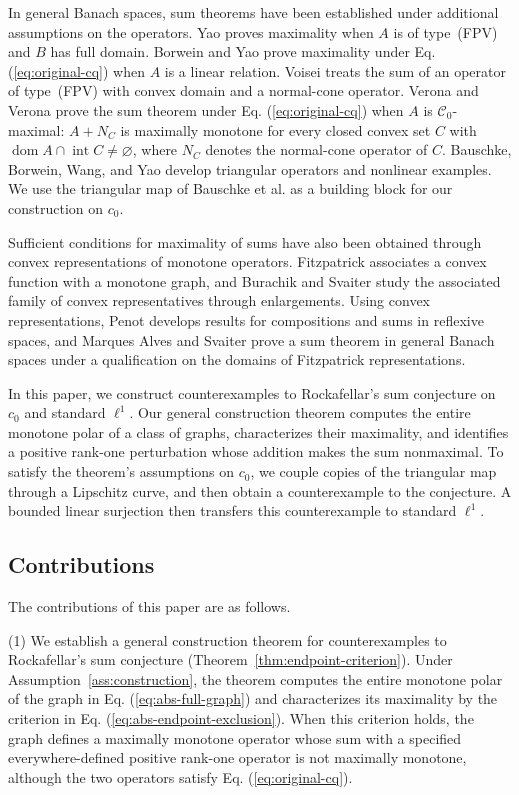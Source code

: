 \documentclass[11pt]{article}
\newcommand{\dom}{\operatorname{dom}}
\theoremstyle{definition}
\theoremstyle{remark}
\begin{document}
In general Banach spaces, sum theorems have been established under additional assumptions on the operators. Yao \cite{yao2010} proves maximality when $A$ is of type~(FPV) and $B$ has full domain. Borwein and Yao \cite{borweinyao2012} prove maximality under Eq. (\ref{eq:original-cq}) when $A$ is a linear relation. Voisei \cite{voisei2010} treats the sum of an operator of type~(FPV) with convex domain and a normal-cone operator. Verona and Verona \cite[Main Result~1.1(b)]{veronaverona2022} prove the sum theorem under Eq. (\ref{eq:original-cq}) when $A$ is $\mathcal C_0$-maximal: $A+N_C$ is maximally monotone for every closed convex set $C$ with $\dom A\cap\operatorname{int}C\ne\varnothing$, where $N_C$ denotes the normal-cone operator of $C$. Bauschke, Borwein, Wang, and Yao \cite{bauschkeetal2011} develop triangular operators and nonlinear examples. We use the triangular map of Bauschke et al. as a building block for our construction on $c_0$.

Sufficient conditions for maximality of sums have also been obtained through convex representations of monotone operators. Fitzpatrick \cite{fitzpatrick1988} associates a convex function with a monotone graph, and Burachik and Svaiter \cite{burachiksvaiter2002} study the associated family of convex representatives through enlargements. Using convex representations, Penot \cite{penot2004} develops results for compositions and sums in reflexive spaces, and Marques Alves and Svaiter \cite{marquessvaiter2012} prove a sum theorem in general Banach spaces under a qualification on the domains of Fitzpatrick representations.



In this paper, we construct counterexamples to Rockafellar's sum conjecture on $c_0$ and standard $\ell^1$. Our general construction theorem computes the entire monotone polar of a class of graphs, characterizes their maximality, and identifies a positive rank-one perturbation whose addition makes the sum nonmaximal. To satisfy the theorem's assumptions on $c_0$, we couple copies of the triangular map through a Lipschitz curve, and then obtain a counterexample to the conjecture. A bounded linear surjection then transfers this counterexample to standard $\ell^1$.

\subsection{Contributions}
The contributions of this paper are as follows.

(1) We establish a general construction theorem for counterexamples to Rockafellar's sum conjecture (Theorem~\ref{thm:endpoint-criterion}). Under Assumption~\ref{ass:construction}, the theorem computes the entire monotone polar of the graph in Eq. (\ref{eq:abs-full-graph}) and characterizes its maximality by the criterion in Eq. (\ref{eq:abs-endpoint-exclusion}). When this criterion holds, the graph defines a maximally monotone operator whose sum with a specified everywhere-defined positive rank-one operator is not maximally monotone, although the two operators satisfy Eq. (\ref{eq:original-cq}).
\end{document}
